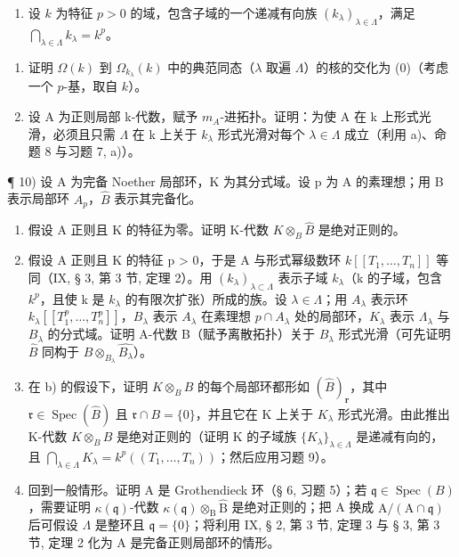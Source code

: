 \begin{enumerate}
\def\labelenumi{\arabic{enumi})}
\setcounter{enumi}{8}
\tightlist
\item
  设 \(k\) 为特征 \(p > 0\) 的域，包含子域的一个递减有向族 \((k_{\lambda})_{\lambda \in \Lambda}\)，满足 \(\bigcap_{\lambda \in \Lambda} k_{\lambda} = k^{p}\)。
\end{enumerate}

\begin{enumerate}
\def\labelenumi{\alph{enumi})}
\item
  证明 \(\Omega(k)\) 到 \(\Omega_{k_{\lambda}}(k)\) 中的典范同态（\(\lambda\) 取遍 \(\Lambda\)）的核的交化为 (0)（考虑一个 \(p\)-基，取自 \(k\)）。
\item
  设 A 为正则局部 k-代数，赋予 \(m_{A}\)-进拓扑。证明：为使 A 在 k 上形式光滑，必须且只需 \(\Lambda\) 在 k 上关于 \(k_{\lambda}\) 形式光滑对每个 \(\lambda \in \Lambda\) 成立（利用 a)、命题 8 与习题 7, a)）。
\end{enumerate}

¶ 10) 设 A 为完备 Noether 局部环，K 为其分式域。设 p 为 A 的素理想；用 B 表示局部环 \(A_{p}\)，\(\widehat{B}\) 表示其完备化。

\begin{enumerate}
\def\labelenumi{\alph{enumi})}
\item
  假设 A 正则且 K 的特征为零。证明 K-代数 \(K \otimes_{B} \widehat{B}\) 是绝对正则的。
\item
  假设 A 正则且 K 的特征 p \textgreater{} 0，于是 A 与形式幂级数环 \(k[[T_{1}, \ldots, T_{n}]]\) 等同（IX, § 3, 第 3 节, 定理 2）。用 \((k_{\lambda})_{\lambda \subset \Lambda}\) 表示子域 \(k_{\lambda}\)（k 的子域，包含 \(k^{p}\)，且使 k 是 \(k_{\lambda}\) 的有限次扩张）所成的族。设 \(\lambda \in \Lambda\)；用 \(A_{\lambda}\) 表示环 \(k_{\lambda}[[T_{1}^{p}, \ldots, T_{n}^{p}]]\)，\(B_{\lambda}\) 表示 \(A_{\lambda}\) 在素理想 \(p \cap A_{\lambda}\) 处的局部环，\(K_{\lambda}\) 表示 \(\Lambda_{\lambda}\) 与 \(B_{\lambda}\) 的分式域。证明 A-代数 B（赋予离散拓扑）关于 \(B_{\lambda}\) 形式光滑（可先证明 \(\widehat{B}\) 同构于 \(B \otimes_{B_{\lambda}} \widehat{B_{\lambda}}\)）。
\item
  在 b) 的假设下，证明 \(K \otimes_{B} \widehat{B}\) 的每个局部环都形如 \((\widehat{B})_{\mathbf{r}}\)，其中 \(\mathfrak{r} \in \operatorname{Spec}(\widehat{B})\) 且 \(\mathfrak{r} \cap B = \{0\}\)，并且它在 K 上关于 \(K_{\lambda}\) 形式光滑。由此推出 K-代数 \(K \otimes_{B} \widehat{B}\) 是绝对正则的（证明 K 的子域族 \(\{K_{\lambda}\}_{\lambda \in \Lambda}\) 是递减有向的，且 \(\bigcap_{\lambda \in \Lambda} K_{\lambda} = k^{p}((T_{1}, \ldots, T_{n}))\)；然后应用习题 9）。
\item
  回到一般情形。证明 A 是 Grothendieck 环（§ 6, 习题 5）；若 \(\mathfrak{q} \in \operatorname{Spec}(B)\)，需要证明 \(\kappa(\mathfrak{q})\)-代数 \(\kappa(\mathfrak{q}) \otimes_{\mathrm{B}} \widehat{\mathrm{B}}\) 是绝对正则的；把 A 换成 \(\mathrm{A}/(\mathrm{A} \cap \mathfrak{q})\) 后可假设 \(\Lambda\) 是整环且 \(\mathfrak{q} = \{0\}\)；将利用 IX, § 2, 第 3 节, 定理 3 与 § 3, 第 3 节, 定理 2 化为 A 是完备正则局部环的情形。
\end{enumerate}

